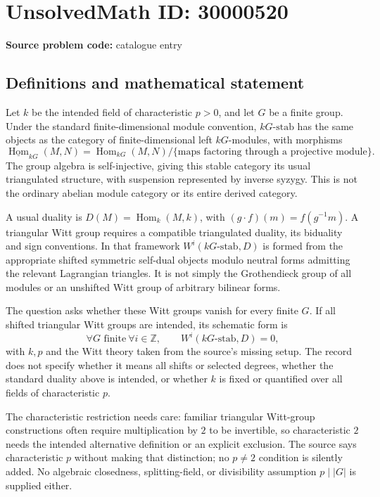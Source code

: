 \documentclass[11pt]{article}
\newcommand{\Z}{\mathbb{Z}}
\begin{document}
\section*{UnsolvedMath ID: 30000520}
\textbf{Source problem code:} catalogue entry
\subsection{Definitions and mathematical statement}
Let \(k\) be the intended field of characteristic \(p>0\), and let \(G\) be a finite group. Under the standard finite-dimensional module convention, \(kG\text{-}\mathrm{stab}\) has the same objects as the category of finite-dimensional left \(kG\)-modules, with morphisms
\[
 \underline{\operatorname{Hom}}_{kG}(M,N)
 =\operatorname{Hom}_{kG}(M,N)\big/
 \{\text{maps factoring through a projective module}\}.
\]
The group algebra is self-injective, giving this stable category its usual triangulated structure, with suspension represented by inverse syzygy. This is not the ordinary abelian module category or its entire derived category.

A usual duality is \(D(M)=\operatorname{Hom}_k(M,k)\), with \((g\cdot f)(m)=f(g^{-1}m)\). A triangular Witt group requires a compatible triangulated duality, its biduality and sign conventions. In that framework \(W^i(kG\text{-}\mathrm{stab},D)\) is formed from the appropriate shifted symmetric self-dual objects modulo neutral forms admitting the relevant Lagrangian triangles. It is not simply the Grothendieck group of all modules or an unshifted Witt group of arbitrary bilinear forms.

The question asks whether these Witt groups vanish for every finite \(G\). If all shifted triangular Witt groups are intended, its schematic form is
\[
 \forall G\text{ finite}\ \forall i\in\Z,\qquad
 W^i(kG\text{-}\mathrm{stab},D)=0,
\]
with \(k,p\) and the Witt theory taken from the source's missing setup. The record does not specify whether it means all shifts or selected degrees, whether the standard duality above is intended, or whether \(k\) is fixed or quantified over all fields of characteristic \(p\).

The characteristic restriction needs care: familiar triangular Witt-group constructions often require multiplication by \(2\) to be invertible, so characteristic \(2\) needs the intended alternative definition or an explicit exclusion. The source says characteristic \(p\) without making that distinction; no \(p\ne2\) condition is silently added. No algebraic closedness, splitting-field, or divisibility assumption \(p\mid|G|\) is supplied either.
\end{document}
